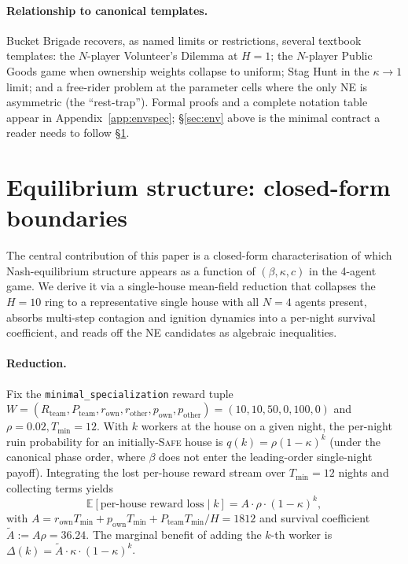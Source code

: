 \documentclass{anvil-paper}
\begin{document}
\paragraph{Relationship to canonical templates.}
Bucket Brigade recovers, as named limits or restrictions, several textbook
templates: the $N$-player Volunteer's Dilemma at $H{=}1$; the $N$-player
Public Goods game when ownership weights collapse to uniform; Stag Hunt in
the $\kappa{\to}1$ limit; and a free-rider problem at the parameter cells
where the only NE is asymmetric (the ``rest-trap''). Formal proofs and a
complete notation table appear in Appendix~\ref{app:envspec};
\S\ref{sec:env} above is the minimal contract a reader needs to follow
\S\ref{sec:ne}.

\section{Equilibrium structure: closed-form boundaries}
\label{sec:ne}

The central contribution of this paper is a closed-form characterisation of
which Nash-equilibrium structure appears as a function of $(\beta,\kappa,c)$
in the 4-agent game. We derive it via a single-house mean-field reduction
that collapses the $H{=}10$ ring to a representative single house with all
$N{=}4$ agents present, absorbs multi-step contagion and ignition dynamics
into a per-night survival coefficient, and reads off the NE candidates as
algebraic inequalities.

\paragraph{Reduction.}
Fix the \texttt{minimal\_specialization} reward tuple
$W{=}(R_{\text{team}},P_{\text{team}},r_{\text{own}},r_{\text{other}},
p_{\text{own}},p_{\text{other}}){=}(10,10,50,0,100,0)$ and $\rho{=}0.02,
T_{\min}{=}12$. With $k$ workers at the house on a given night, the per-night
ruin probability for an initially-\textsc{Safe} house is
$q(k){=}\rho(1-\kappa)^k$ (under the canonical phase order, where $\beta$
does not enter the leading-order single-night payoff). Integrating the lost
per-house reward stream over $T_{\min}{=}12$ nights and collecting terms
yields
\[
  \mathbb{E}[\text{per-house reward loss}\mid k] = A\cdot\rho\cdot(1-\kappa)^k,
\]
with $A{=}r_{\text{own}}T_{\min}+p_{\text{own}}T_{\min}+P_{\text{team}}
T_{\min}/H{=}1812$ and survival coefficient
$\tilde A{:=}A\rho{=}36.24$. The marginal benefit of adding the $k$-th
worker is $\Delta(k){=}\tilde A\cdot\kappa\cdot(1-\kappa)^k$.
\end{document}
